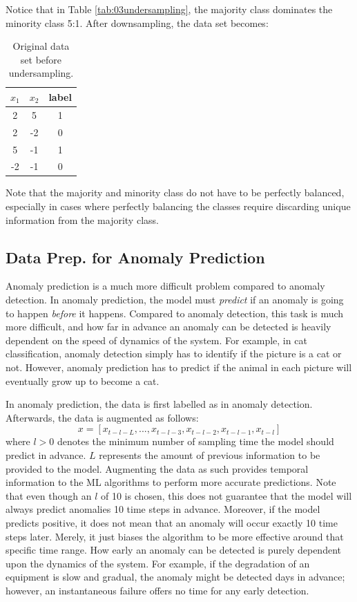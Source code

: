 Notice that in Table \ref{tab:03undersampling}, the majority class dominates the minority class 5:1.  After downsampling, the data set becomes:

\begin{table}[H]
    \centering
    \begin{tabular}{ c | c | c }
        $x_1$ & $x_2$ & label \\
        \hline
        2 & 5 & 1 \\
        2 & -2 & 0 \\
        5 & -1 & 1 \\
        -2 & -1 & 0 \\
    \end{tabular}
    \caption{Original data set before undersampling.}
    \label{tab:03undersampling2}
\end{table}
Note that the majority and minority class do not have to be perfectly balanced, especially in cases where perfectly balancing the classes require discarding unique information from the majority class.

\subsection{Data Prep. for Anomaly Prediction}
Anomaly prediction is a much more difficult problem compared to anomaly detection.  In anomaly prediction, the model must \textit{predict} if an anomaly is going to happen \textit{before} it happens.  Compared to anomaly detection, this task is much more difficult, and how far in advance an anomaly can be detected is heavily dependent on the speed of dynamics of the system.  For example, in cat classification, anomaly detection simply has to identify if the picture is a cat or not.  However, anomaly prediction has to predict if the animal in each picture will eventually grow up to become a cat.

In anomaly prediction, the data is first labelled as in anomaly detection. Afterwards, the data is augmented as follows:
\begin{equation}
    x = [x_{t - l - L}, ...,  x_{t - l - 3}, x_{t - l - 2},  x_{t - l - 1},  x_{t - l}]
    \label{eq:03prediction}
\end{equation}
where $l > 0$ denotes the minimum number of sampling time the model should predict in advance.  $L$ represents the amount of previous information to be provided to the model. Augmenting the data as such provides temporal information to the ML algorithms to perform more accurate predictions. Note that even though an $l$ of 10 is chosen, this does not guarantee that the model will always predict anomalies 10 time steps in advance. Moreover, if the model predicts positive, it does not mean that an anomaly will occur exactly 10 time steps later. Merely, it just biases the algorithm to be more effective around that specific time range. How early an anomaly can be detected is purely dependent upon the dynamics of the system.  For example, if the degradation of an equipment is slow and gradual, the anomaly might be detected days in advance; however, an instantaneous failure offers no time for any early detection.

